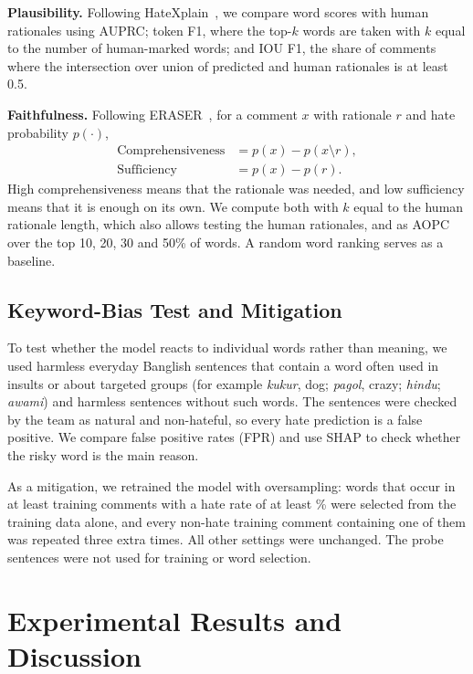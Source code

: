 \documentclass[conference,letterpaper,10pt]{IEEEtran}
\begin{document}
\textbf{Plausibility.} Following HateXplain~\cite{mathew2021hatexplain}, we compare word scores with human rationales using AUPRC; token F1, where the top-$k$ words are taken with $k$ equal to the number of human-marked words; and IOU F1, the share of comments where the intersection over union of predicted and human rationales is at least 0.5.

\textbf{Faithfulness.} Following ERASER~\cite{deyoung2020eraser}, for a comment $x$ with rationale $r$ and hate probability $p(\cdot)$,
\begin{align}
\text{Comprehensiveness} &= p(x) - p(x \setminus r), \\
\text{Sufficiency} &= p(x) - p(r).
\end{align}
High comprehensiveness means that the rationale was needed, and low sufficiency means that it is enough on its own. We compute both with $k$ equal to the human rationale length, which also allows testing the human rationales, and as AOPC over the top 10, 20, 30 and 50\% of words. A random word ranking serves as a baseline.

\subsection{Keyword-Bias Test and Mitigation}
To test whether the model reacts to individual words rather than meaning, we used \biasNA{} harmless everyday Banglish sentences that contain a word often used in insults or about targeted groups (for example \emph{kukur}, dog; \emph{pagol}, crazy; \emph{hindu}; \emph{awami}) and \biasNB{} harmless sentences without such words. The sentences were checked by the team as natural and non-hateful, so every hate prediction is a false positive. We compare false positive rates (FPR) and use SHAP to check whether the risky word is the main reason.

As a mitigation, we retrained the model with oversampling: words that occur in at least \ifdebias\debMinCount{}\fi{} training comments with a hate rate of at least \ifdebias\debMinRate{}\fi\% were selected from the training data alone, and every non-hate training comment containing one of them was repeated three extra times. All other settings were unchanged. The probe sentences were not used for training or word selection.

\section{Experimental Results and Discussion}
\end{document}
